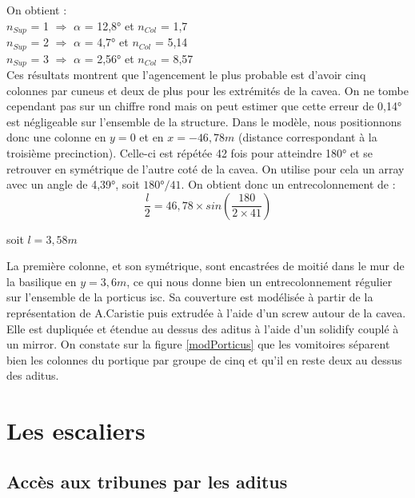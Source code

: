 On obtient : \\
$n_{Sup}$ = 1 $\Rightarrow$ $\alpha$ = 12,8° et $n_{Col}$ = 1,7 \\
$n_{Sup}$ = 2 $\Rightarrow$ $\alpha$ = 4,7° et $n_{Col}$ = 5,14 \\
$n_{Sup}$ = 3 $\Rightarrow$ $\alpha$ = 2,56° et $n_{Col}$ = 8,57 \\


Ces résultats montrent que l'agencement le plus probable est d'avoir cinq colonnes par \gls{cuneus} et deux de plus pour les extrémités de la \gls{cavea}. On ne tombe cependant pas sur un chiffre rond mais on peut estimer que cette erreur de 0,14° est négligeable sur l'ensemble de la structure. Dans le modèle, nous positionnons donc une colonne en $y=0$ et en $x=-46,78m$ (distance correspondant à la troisième \gls{precinction}). Celle-ci est répétée 42 fois pour atteindre 180° et se retrouver en symétrique de l'autre coté de la \gls{cavea}. On utilise pour cela un \gls{array} avec un angle de 4,39°, soit $180°/41$. On obtient donc un entrecolonnement de :
\begin{equation}
	\frac{l}{2} =  46,78 \times  sin(\frac{180}{2 \times 41}) 
\end{equation}
\begin{center}
	soit $l = 3,58m$
\end{center}	

La première colonne, et son symétrique, sont encastrées de moitié dans le mur de la basilique en $y=3,6m$, ce qui nous donne bien un entrecolonnement régulier sur l'ensemble de la \gls{porticus isc}. Sa couverture est modélisée à partir de la représentation de A.Caristie \cite[Pl. III et VI]{orangePl} puis extrudée à l'aide d'un \gls{screw} autour de la  \gls{cavea}. Elle est dupliquée et étendue au dessus des \gls{aditus} à l'aide d'un \gls{solidify} couplé à un \gls{mirror}. On constate sur la figure \ref{modPorticus} que les vomitoires séparent bien les colonnes du portique par groupe de cinq et qu'il en reste deux au dessus des  \gls{aditus}.

\section{Les escaliers} \label{sect-escaliers}

\subsection{Accès aux tribunes par les  \gls{aditus}}

